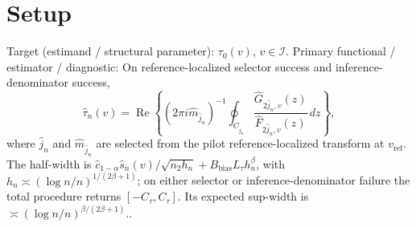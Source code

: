 \documentclass{article}
\begin{document}
\section{Setup}

Target (estimand / structural parameter): \(\tau_0(v)\), \(v\in\mathcal I\).
Primary functional / estimator / diagnostic: On reference-localized selector success and inference-denominator success,
\[
 \widehat\tau_n(v)=\operatorname{Re}\left\{
 (2\pi i\widehat m_{\widehat j_n})^{-1}
 \oint_{C_{\widehat j_n}}
 \frac{\widehat G_{2\widehat j_n,v}(z)}
 {\widehat F_{2\widehat j_n,v}(z)}\,dz\right\},
\]
where \(\widehat j_n\) and \(\widehat m_{\widehat j_n}\) are selected from the pilot reference-localized transform at \(v_{\mathrm{ref}}\). The half-width is \(\widehat c_{1-\alpha}\widehat s_n(v)/\sqrt{n_2h_n}+B_{\mathrm{bias}}L_\tau h_n^\beta\), with \(h_n\asymp(\log n/n)^{1/(2\beta+1)}\); on either selector or inference-denominator failure the total procedure returns \([-C_\tau,C_\tau]\). Its expected sup-width is \(\asymp(\log n/n)^{\beta/(2\beta+1)}\)..
\end{document}
